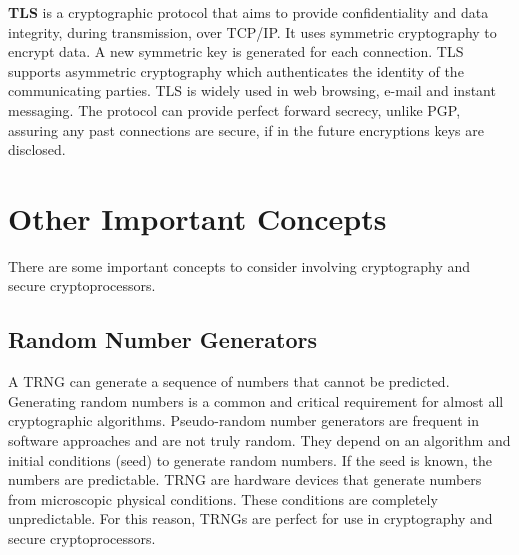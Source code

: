 \textbf{\ac{TLS}} is a cryptographic protocol that aims to provide confidentiality and data integrity, during transmission, over TCP/IP. It uses symmetric cryptography to encrypt data. A new symmetric key is generated for each connection.
\ac{TLS} supports asymmetric cryptography which authenticates the identity of the communicating parties.
\ac{TLS} is widely used in web browsing, e-mail and instant messaging.
The protocol can provide perfect forward secrecy, unlike \ac{PGP}, assuring any past connections are secure, if in the future encryptions keys are disclosed.



\section{Other Important Concepts}\label{chap:background:other}

There are some important concepts to consider involving cryptography and secure cryptoprocessors.

\subsection{Random Number Generators}
A \ac{TRNG} can generate a sequence of numbers that cannot be predicted. Generating random numbers is a common and critical requirement for almost all cryptographic algorithms. Pseudo-random number generators are frequent in software approaches and are not truly random. They depend on an algorithm and initial conditions (seed) to generate random numbers. If the seed is known, the numbers are predictable.
\ac{TRNG} are hardware devices that generate numbers from microscopic physical conditions. These conditions are completely unpredictable. For this reason, \ac{TRNG}s are perfect for use in cryptography and secure cryptoprocessors.

